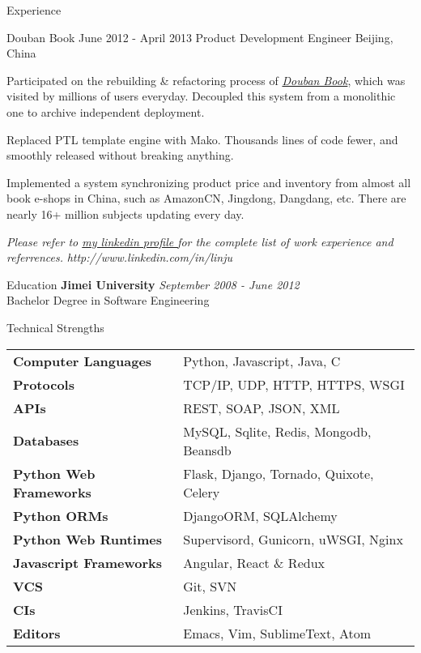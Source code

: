 \documentclass{resume}
\begin{document}
\begin{rSection}{Experience}
    \begin{rSubsection}{Douban Book}{ June 2012 - April 2013 }{ Product Development Engineer }{Beijing, China}
    \item Participated on the rebuilding \& refactoring process of \href{book.douban.com}{\textit {Douban Book}}, which was visited by millions of users everyday. Decoupled this system from a monolithic one to archive independent deployment.
    \item Replaced PTL template engine with Mako. Thousands lines of code fewer, and smoothly released without breaking anything.
    \item Implemented a system synchronizing product price and inventory from almost all book e-shops in China, such as AmazonCN, Jingdong, Dangdang, etc. There are nearly 16+ million subjects updating every day.
    \end{rSubsection}

  \end{rSection}

  \begin{center}
  \textit{ Please refer to \href{http://www.linkedin.com/in/linju}{ my linkedin profile } for the complete list of work experience and referrences.}
  \textit{ http://www.linkedin.com/in/linju }
  \end{center}

  \newpage

  \begin{rSection}{Education}
    { \bf Jimei University  } \hfill {\em September 2008 - June 2012 } \\
    { Bachelor Degree in Software Engineering } \\
  \end{rSection}

  \begin{rSection}{Technical Strengths}
    \begin{tabular}{ @{} >{\bfseries}l @{\hspace{6ex}} l }
      Computer Languages & Python, Javascript, Java, C \\
      Protocols & TCP/IP, UDP, HTTP, HTTPS, WSGI \\
      APIs & REST, SOAP, JSON, XML \\
      Databases & MySQL, Sqlite, Redis, Mongodb, Beansdb \\
      Python Web Frameworks & Flask, Django, Tornado, Quixote, Celery \\
      Python ORMs & DjangoORM, SQLAlchemy \\
      Python Web Runtimes & Supervisord, Gunicorn, uWSGI, Nginx \\
      Javascript Frameworks & Angular, React \& Redux \\
      VCS & Git, SVN \\
      CIs & Jenkins, TravisCI \\
      Editors & Emacs, Vim, SublimeText, Atom \\
    \end{tabular}
  \end{rSection}
\end{document}

